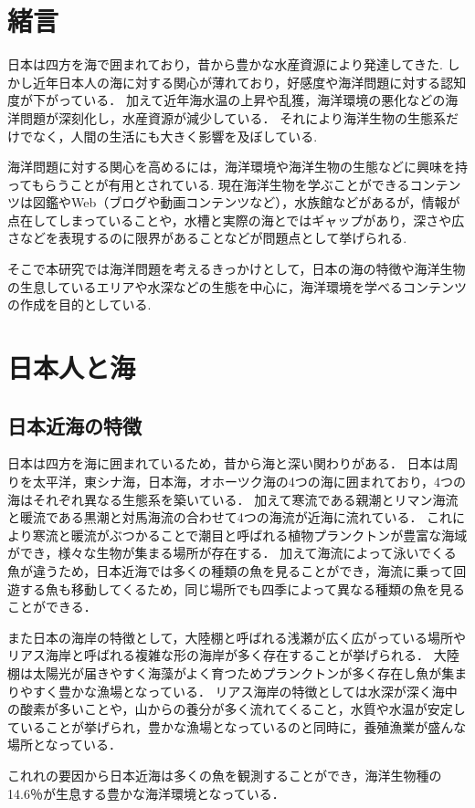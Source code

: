 \documentclass[12pt,a4j,titlepage]{ltjsarticle}
\begin{document}
\section{緒言}\label{緒言}
日本は四方を海で囲まれており，昔から豊かな水産資源により発達してきた.
しかし近年日本人の海に対する関心が薄れており，好感度や海洋問題に対する認知度が下がっている．
加えて近年海水温の上昇や乱獲，海洋環境の悪化などの海洋問題が深刻化し，水産資源が減少している．
それにより海洋生物の生態系だけでなく，人間の生活にも大きく影響を及ぼしている.\par
海洋問題に対する関心を高めるには，海洋環境や海洋生物の生態などに興味を持ってもらうことが有用とされている.
現在海洋生物を学ぶことができるコンテンツは図鑑やWeb（ブログや動画コンテンツなど），水族館などがあるが，情報が点在してしまっていることや，水槽と実際の海とではギャップがあり，深さや広さなどを表現するのに限界があることなどが問題点として挙げられる.\par
そこで本研究では海洋問題を考えるきっかけとして，日本の海の特徴や海洋生物の生息しているエリアや水深などの生態を中心に，海洋環境を学べるコンテンツの作成を目的としている.

\clearpage

\section{日本人と海}\label{人と海}

\subsection{日本近海の特徴}
日本は四方を海に囲まれているため，昔から海と深い関わりがある．
日本は周りを太平洋，東シナ海，日本海，オホーツク海の4つの海に囲まれており，4つの海はそれぞれ異なる生態系を築いている．
加えて寒流である親潮とリマン海流と暖流である黒潮と対馬海流の合わせて4つの海流が近海に流れている．
これにより寒流と暖流がぶつかることで潮目と呼ばれる植物プランクトンが豊富な海域ができ，様々な生物が集まる場所が存在する．
加えて海流によって泳いでくる魚が違うため，日本近海では多くの種類の魚を見ることができ，海流に乗って回遊する魚も移動してくるため，同じ場所でも四季によって異なる種類の魚を見ることができる．\par
また日本の海岸の特徴として，大陸棚と呼ばれる浅瀬が広く広がっている場所やリアス海岸と呼ばれる複雑な形の海岸が多く存在することが挙げられる．
大陸棚は太陽光が届きやすく海藻がよく育つためプランクトンが多く存在し魚が集まりやすく豊かな漁場となっている．
リアス海岸の特徴としては水深が深く海中の酸素が多いことや，山からの養分が多く流れてくること，水質や水温が安定していることが挙げられ，豊かな漁場となっているのと同時に，養殖漁業が盛んな場所となっている．\par
これれの要因から日本近海は多くの魚を観測することができ，海洋生物種の14.6％が生息する豊かな海洋環境となっている．
\end{document}
